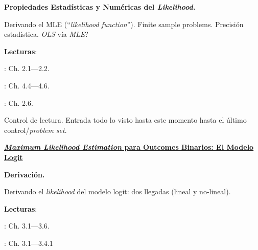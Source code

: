 \documentclass[letterpaper]{article}
\renewenvironment{itemize}{
  \begin{list}{}{
    \setlength{\leftmargin}{1.5em}
  }
}{
  \end{list}
}
\begin{document}
\begin{enumerate}[label=\roman*.]
      \begin{itemize} 
        \item[10.] {\bf Propiedades Estad\'isticas y Num\'ericas del \emph{Likelihood}.}
        \begin{itemize} 
          \item[$\circ$] Derivando el MLE (``\emph{likelihood function}''). Finite sample problems. Precisi\'on estad\'istica. \emph{OLS} v\'ia \emph{MLE}?
          \item[$\circ$] {\bf Lecturas}: 
            \begin{itemize} 
              \item[$\diamond$] \textcite{Ward2018}: Ch. 2.1---2.2. 
              \item[$\diamond$] \textcite{King1998}: Ch. 4.4---4.6.
              \item[$\diamond$] \textcite{Long2001}: Ch. 2.6.
            \end{itemize}
        \end{itemize}
      \end{itemize}

\item[{\color{red}\Pointinghand}] Control de lectura. Entrada todo lo visto hasta este momento hasta el \'ultimo control/\emph{problem set}.


\item {\bf {\color{ForestGreen}\underline{\emph{Maximum Likelihood Estimation} para Outcomes Binarios: El Modelo Logit}}}


        \begin{itemize} 
        \item[11.] {\bf Derivaci\'on.}
        \begin{itemize} 
          \item[$\circ$] Derivando el \emph{likelihood} del modelo logit: dos llegadas (lineal y no-lineal).
          \item[$\circ$] {\bf Lecturas}: 
            \begin{itemize} 
              \item[$\diamond$] \textcite{Long2001}: Ch. 3.1---3.6.
              \item[$\diamond$] \textcite{Ward2018}: Ch. 3.1---3.4.1
            \end{itemize}
        \end{itemize}
      \end{itemize}


\end{enumerate}
\end{document}
